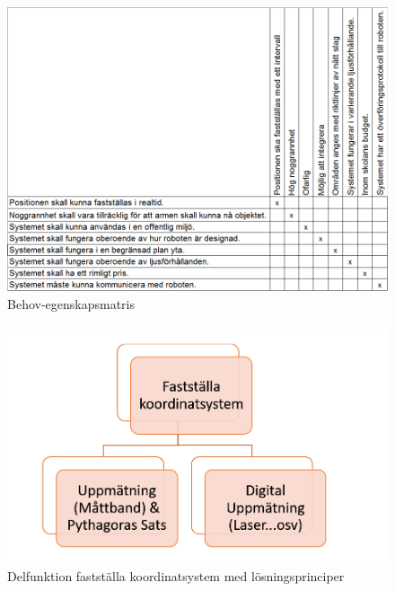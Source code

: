 \documentclass[11pt, a4paper]{report}
\begin{document}
\begin{figure}[H]
	\begin{center}
		\includegraphics [width=12cm,angle=0]{behov-egenskap-matris.PNG}
		\caption{Behov-egenskapsmatris}
		\label{fig:behov-egenskap}
	\end{center}
\end{figure}


\begin{figure}[H]
	\begin{center}
		\includegraphics [width=12cm, height=7cm, angle=0]{faststallakoordinatsystem.PNG}
		\caption{Delfunktion fastställa koordinatsystem med lösningsprinciper}
		\label{fig:koordinatsystem}
	\end{center}
\end{figure}
\end{document}
